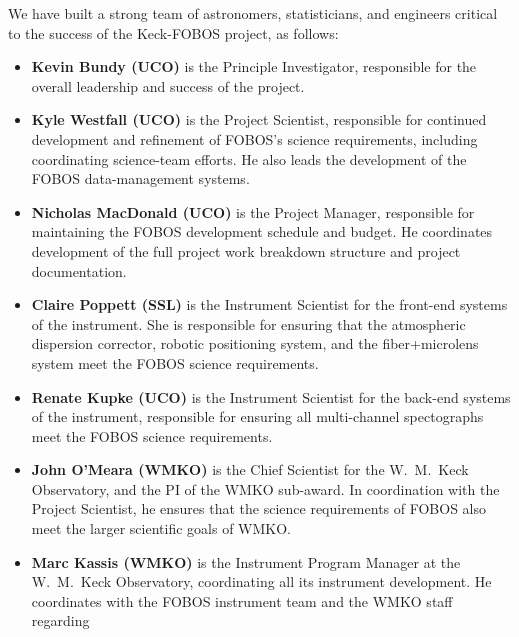 \documentclass[oneside,11pt]{amsart}
\begin{document}

\begin{center}
\end{center}

\smallskip

\noindent We have built a strong team of astronomers, statisticians, and
engineers critical to the success of the Keck-FOBOS project, as follows:
%
\begin{itemize}
%
\item {\bf Kevin Bundy (UCO)} is the Principle Investigator, responsible
for the overall leadership and success of the project.\\[-5pt]
%
\item {\bf Kyle Westfall (UCO)} is the Project Scientist, responsible
for continued development and refinement of FOBOS's science
requirements, including coordinating science-team efforts.  He also
leads the development of the FOBOS data-management systems.\\[-5pt]
%
\item {\bf Nicholas MacDonald (UCO)} is the Project Manager, responsible
for maintaining the FOBOS development schedule and budget. He
coordinates development of the full project work breakdown structure and
project documentation.\\[-5pt]
%
\item {\bf Claire Poppett (SSL)} is the Instrument Scientist for the
front-end systems of the instrument. She is responsible for ensuring
that the atmospheric dispersion corrector, robotic positioning system,
and the fiber+microlens system meet the FOBOS science
requirements.\\[-5pt]
%
\item {\bf Renate Kupke (UCO)} is the Instrument Scientist for the
back-end systems of the instrument, responsible for ensuring all
multi-channel spectographs meet the FOBOS science requirements.\\[-5pt]
%
\item {\bf John O'Meara (WMKO)} is the Chief Scientist for the
W.~M.~Keck Observatory, and the PI of the WMKO sub-award. In
coordination with the Project Scientist, he ensures that the science
requirements of FOBOS also meet the larger scientific goals of
WMKO.\\[-5pt]
%
\item {\bf Marc Kassis (WMKO)} is the Instrument Program Manager at the
W.~M.~Keck Observatory, coordinating all its instrument development. He
coordinates with the FOBOS instrument team and the WMKO staff regarding

\end{itemize}
\end{document}
